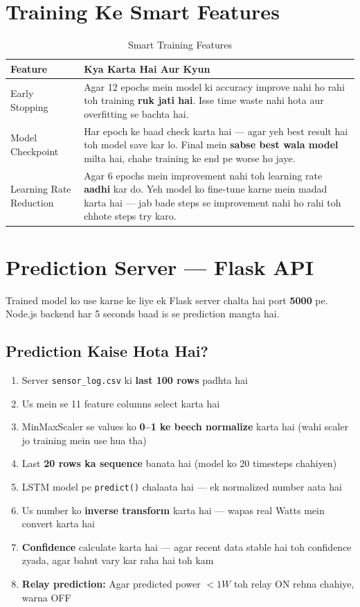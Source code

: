 \section{Training Ke Smart Features}

\begin{table}[H]
\centering
\begin{tabularx}{\textwidth}{l X}
\toprule
\textbf{Feature} & \textbf{Kya Karta Hai Aur Kyun} \\
\midrule
Early Stopping & Agar 12 epochs mein model ki accuracy improve nahi ho rahi toh training \textbf{ruk jati hai}. Isse time waste nahi hota aur overfitting se bachta hai. \\
Model Checkpoint & Har epoch ke baad check karta hai --- agar yeh best result hai toh model save kar lo. Final mein \textbf{sabse best wala model} milta hai, chahe training ke end pe worse ho jaye. \\
Learning Rate Reduction & Agar 6 epochs mein improvement nahi toh learning rate \textbf{aadhi} kar do. Yeh model ko fine-tune karne mein madad karta hai --- jab bade steps se improvement nahi ho rahi toh chhote steps try karo. \\
\bottomrule
\end{tabularx}
\caption{Smart Training Features}
\end{table}

\section{Prediction Server --- Flask API}

Trained model ko use karne ke liye ek Flask server chalta hai port \textbf{5000} pe. Node.js backend har 5 seconds baad is se prediction mangta hai.

\subsection{Prediction Kaise Hota Hai?}

\begin{enumerate}
    \item Server \texttt{sensor\_log.csv} ki \textbf{last 100 rows} padhta hai
    \item Us mein se 11 feature columns select karta hai
    \item MinMaxScaler se values ko \textbf{0--1 ke beech normalize} karta hai (wahi scaler jo training mein use hua tha)
    \item Last \textbf{20 rows ka sequence} banata hai (model ko 20 timesteps chahiyen)
    \item LSTM model pe \texttt{predict()} chalaata hai --- ek normalized number aata hai
    \item Us number ko \textbf{inverse transform} karta hai --- wapas real Watts mein convert karta hai
    \item \textbf{Confidence} calculate karta hai --- agar recent data stable hai toh confidence zyada, agar bahut vary kar raha hai toh kam
    \item \textbf{Relay prediction:} Agar predicted power $< 1W$ toh relay ON rehna chahiye, warna OFF
\end{enumerate}

